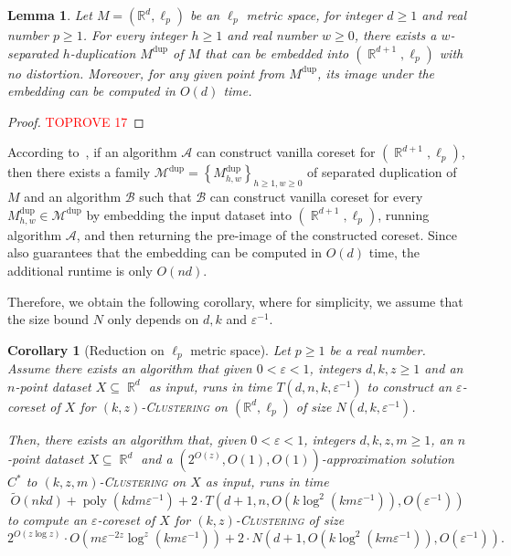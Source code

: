 \documentclass[letterpaper,11pt]{article}
\theoremstyle{plain}
\newtheorem{lemma}[theorem]{Lemma}
\newtheorem{corollary}[theorem]{Corollary}
\theoremstyle{definition}
\theoremstyle{remark}
\DeclareMathOperator{\R}{\mathbb{R}}
\DeclareMathOperator{\poly}{poly}
\newcommand{\dup}{\mathrm{dup}}
\newcommand{\eps}{\varepsilon}
\newcommand{\calA}{\mathcal{A}}
\newcommand{\calB}{\mathcal{B}}
\newcommand{\calM}{\mathcal{M}}
\newcommand{\ProblemName}[1]{\textsc{#1}}
\newcommand{\kzC}{\ProblemName{$(k,z)$-Clustering}\xspace}
\newcommand{\kzmC}{\ProblemName{$(k,z,m)$-Clustering}\xspace}
\begin{document}
\begin{appendices}
\begin{lemma}
    \label{lem:duplication for Euclidean case}
    Let $M=(\mathbb{R}^d,\ell_p)$ be an $\ell_p$ metric space, for integer $d\geq 1$ and real number $p\geq 1$.
For every integer $h\ge 1$ and real number $w\ge 0$, there exists a $w$-separated $h$-duplication $M^\dup$ of $M$ that can be embedded into $(\R^{d+1},\ell_p)$ with no distortion. Moreover, for any given point from $M^\dup$, its image under the embedding can be computed in $O(d)$ time.
\end{lemma}
\begin{proof}\textcolor{red}{TOPROVE 17}\end{proof}

According to~, 
if an algorithm $\calA$ can construct vanilla coreset for $(\R^{d+1},\ell_p)$, then there exists a family $\calM^\dup = \left\{M^\dup_{h,w} \right\}_{h\ge 1,w\ge 0}$ of separated duplication of $M$ and an algorithm $\calB$ such that $\calB$ can construct vanilla coreset for every $M^\dup_{h,w}\in\calM^\dup$ by embedding the input dataset into $(\R^{d+1}, \ell_p)$, running algorithm $\calA$, and then returning the pre-image of the constructed coreset.
Since  also guarantees that the embedding can be computed in $O(d)$ time, the additional runtime is only $O(nd)$.

Therefore, we obtain the following corollary, where for simplicity, we assume that the size bound $N$ only depends on $d,k$ and $\eps^{-1}$.


\begin{corollary}[Reduction on $\ell_p$ metric space]
    \label{cor:Euclidean space}
    Let $p\ge 1$ be a real number. 
    Assume there exists an algorithm that given $0<\eps<1$, integers $d, k,z\ge 1$ and an $n$-point dataset $X\subseteq \R^{d}$ as input, runs in time $T(d,n,k,\eps^{-1})$ to construct an $\eps$-coreset of $X$  for \kzC on $(\mathbb{R}^d, \ell_p)$ of size $N(d,k,\eps^{-1})$.

    Then, there exists an algorithm that, given $0<\eps<1$, integers $d,k,z,m\ge 1$, an $n$-point dataset $X\subseteq \R^d$ and a $(2^{O(z)},O(1),O(1))$-approximation solution $C^*$ to \kzmC on $X$ as input, runs in time
    \begin{equation*}
        \tilde O(nkd) + \poly(kdm\eps^{-1}) + 2\cdot T(d+1,n,O(k\log^2(km\eps^{-1})),O(\eps^{-1}))
    \end{equation*}
    to compute an $\eps$-coreset of $X$ for \kzC of size 
    \begin{equation*}
        2^{O(z\log z)}\cdot O\left(m\eps^{-2z}\log^z(km\eps^{-1})\right) + 2\cdot N\left(d+1,O(k\log^2(km\eps^{-1})), O(\eps^{-1})\right).
    \end{equation*}
\end{corollary}


\end{appendices}
\end{document}
